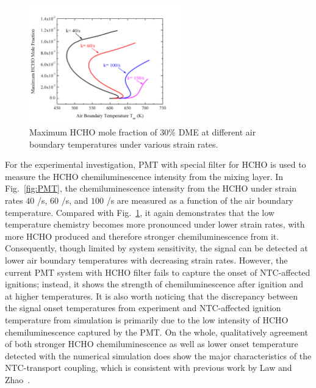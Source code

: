 \documentclass[review,3p,times]{elsarticleUS}
\begin{document}
\begin{figure}[ht]
  \centering
  \scriptsize
  \vspace{-0.1in}
  \includegraphics[width=0.6\textwidth]{Scurve-SR.png}
  \normalsize
  \vspace{-0.1in}
  \caption{Maximum HCHO mole fraction of $30\%$ DME at different air boundary temperatures under various strain rates.}
  \label{fig:Scurve-SR}
\end{figure}

For the experimental investigation, PMT with special filter for HCHO is used to measure the HCHO chemiluminescence intensity from the mixing layer. In Fig.~\ref{fig:PMT}, the chemiluminescence intensity from the HCHO under strain rates $40$ /s, $60$ /s, and $100$ /s are measured as a function of the air boundary temperature. Compared with Fig.~\ref{fig:Scurve-SR}, it again demonstrates that the low temperature chemistry becomes more pronounced under lower strain rates, with more HCHO produced and therefore stronger chemiluminescence from it. Consequently, though limited by system sensitivity, the signal can be detected at lower air boundary temperatures with decreasing strain rates. However, the current PMT system with HCHO filter fails to capture the onset of NTC-affected ignitions; instead, it shows the strength of chemiluminescence after ignition and at higher temperatures. It is also worth noticing that the discrepancy between the signal onset temperatures from experiment and NTC-affected ignition temperature from simulation is primarily due to the low intensity of HCHO chemiluminescence captured by the PMT. On the whole, qualitatively agreement of both stronger HCHO chemiluminescence as well as lower onset temperature detected with the numerical simulation does show the major characteristics of the NTC-transport coupling, which is consistent with previous work by Law and Zhao~\cite{law12}. 
\end{document}
